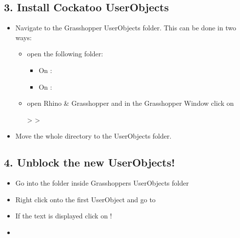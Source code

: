 \documentclass[letterpaper,10pt,english]{sphinxmanual}
\begin{document}
\subsection{3. Install Cockatoo UserObjects}
\label{\detokenize{README:install-cockatoo-userobjects}}\label{\detokenize{README:id4}}\begin{itemize}
\item {} 
Navigate to the Grasshopper UserObjects folder. This can be done in
two ways:
\begin{itemize}
\item {} 
 open the following folder:
\begin{itemize}
\item {} 
On :

\item {} 
On : 

\end{itemize}

\item {} 
 open Rhino \& Grasshopper and in the Grasshopper Window click
on

 \textgreater{}  \textgreater{} 

\end{itemize}

\item {} 
Move the whole  directory to the UserObjects folder.

\end{itemize}


\subsection{4. Unblock the new UserObjects!}
\label{\detokenize{README:unblock-the-new-userobjects}}\label{\detokenize{README:id5}}\begin{itemize}
\item {} 
Go into the  folder inside Grasshoppers UserObjects
folder

\item {} 
Right click onto the first UserObject and go to 

\item {} 
If the text  is displayed
click on !

\item {} 

\end{itemize}
\end{document}

